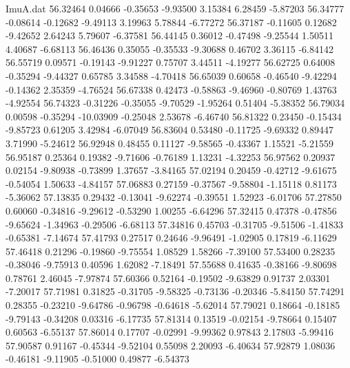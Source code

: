\begin{filecontents}{ImuA.dat}
  56.32464    0.04666   -0.35653   -9.93500    3.15384    6.28459   -5.87203
  56.34777   -0.08614   -0.12682   -9.49113    3.19963    5.78844   -6.77272
  56.37187   -0.11605    0.12682   -9.42652    2.64243    5.79607   -6.37581
  56.44145    0.36012   -0.47498   -9.25544    1.50511    4.40687   -6.68113
  56.46436    0.35055   -0.35533   -9.30688    0.46702    3.36115   -6.84142
  56.55719    0.09571   -0.19143   -9.91227    0.75707    3.44511   -4.19277
  56.62725    0.64008   -0.35294   -9.44327    0.65785    3.34588   -4.70418
  56.65039    0.60658   -0.46540   -9.42294   -0.14362    2.35359   -4.76524
  56.67338    0.42473   -0.58863   -9.46960   -0.80769    1.43763   -4.92554
  56.74323   -0.31226   -0.35055   -9.70529   -1.95264    0.51404   -5.38352
  56.79034    0.00598   -0.35294  -10.03909   -0.25048    2.53678   -6.46740
  56.81322    0.23450   -0.15434   -9.85723    0.61205    3.42984   -6.07049
  56.83604    0.53480   -0.11725   -9.69332    0.89447    3.71990   -5.24612
  56.92948    0.48455    0.11127   -9.58565   -0.43367    1.15521   -5.21559
  56.95187    0.25364    0.19382   -9.71606   -0.76189    1.13231   -4.32253
  56.97562    0.20937    0.02154   -9.80938   -0.73899    1.37657   -3.84165
  57.02194    0.20459   -0.42712   -9.61675   -0.54054    1.50633   -4.84157
  57.06883    0.27159   -0.37567   -9.58804   -1.15118    0.81173   -5.36062
  57.13835    0.29432   -0.13041   -9.62274   -0.39551    1.52923   -6.01706
  57.27850    0.60060   -0.34816   -9.29612   -0.53290    1.00255   -6.64296
  57.32415    0.47378   -0.47856   -9.65624   -1.34963   -0.29506   -6.68113
  57.34816    0.45703   -0.31705   -9.51506   -1.41833   -0.65381   -7.14674
  57.41793    0.27517    0.24646   -9.96491   -1.02905    0.17819   -6.11629
  57.46418    0.21296   -0.19860   -9.75554    1.08529    1.58266   -7.39100
  57.53400    0.28235   -0.38046   -9.75913    0.40596    1.62082   -7.18491
  57.55688    0.41635   -0.38166   -9.80698    0.78761    2.46045   -7.97874
  57.60366    0.52164   -0.19502   -9.63829    0.91737    2.03301   -7.20017
  57.71981    0.31825   -0.31705   -9.58325   -0.73136   -0.20346   -5.84150
  57.74291    0.28355   -0.23210   -9.64786   -0.96798   -0.64618   -5.62014
  57.79021    0.18664   -0.18185   -9.79143   -0.34208    0.03316   -6.17735
  57.81314    0.13519   -0.02154   -9.78664    0.15407    0.60563   -6.55137
  57.86014    0.17707   -0.02991   -9.99362    0.97843    2.17803   -5.99416
  57.90587    0.91167   -0.45344   -9.52104    0.55098    2.20093   -6.40634
  57.92879    1.08036   -0.46181   -9.11905   -0.51000    0.49877   -6.54373

\end{filecontents}
